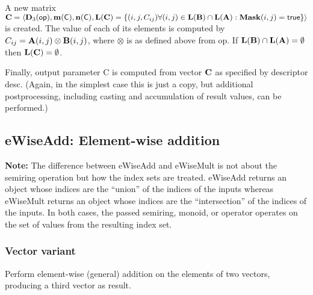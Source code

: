 A new matrix ${\bf C} = \langle \bold{D}_3({\sf op}), \bold{m}({\bf \sf C}),
\bold{n}({\bf \sf C}), \bold{L}({\bf C}) = \{(i,j,C_{ij})  \forall (i,j) \in
\bold{L}({\bf B}) \cap \bold{L}({\bf A}) : {\bf Mask}(i,j)
= {\sf true} \} \rangle$ is created.  The value of each of its
elements is computed by $C_{ij} = {\bf A}(i,j) \otimes {\bf B}(i,j)$,
where $\otimes$ is as defined above from {\sf op}.
If $\bold{L}({\bf B}) \cap \bold{L}({\bf A}) = \emptyset$
then $\bold{L}({\bf C}) = \emptyset$.

Finally, output parameter {\sf C} is computed from vector ${\bf C}$
as specified by descriptor {\sf desc}. (Again, in the simplest case this
is just a copy, but additional postprocessing, including casting and
accumulation of result values, can be performed.) 



\subsection{{\sf eWiseAdd}: Element-wise addition}

{\bf Note:} The difference between {\sf eWiseAdd} and {\sf eWiseMult} is not about the semiring operation but how the index sets are treated.
 {\sf eWiseAdd} returns an object whose indices are the ``union'' of the indices of the inputs whereas  
 {\sf eWiseMult} returns an object whose indices are the ``intersection'' of the indices of the inputs. In both cases, the passed semiring, monoid, or operator operates on the 
 set of values from the resulting index set. 

\subsubsection{Vector variant}

Perform element-wise (general) addition on the elements of two vectors,
producing a third vector as result.

\paragraph{\syntax}

